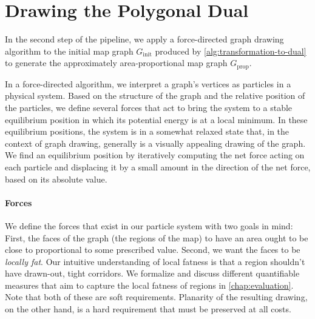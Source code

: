 \section{Drawing the Polygonal Dual}
\label{sect:drawing-the-dual}

In the second step of the pipeline, we apply a force-directed graph drawing algorithm to the initial map graph $G_\text{init}$ produced by \cref{alg:transformation-to-dual} to generate the approximately area-proportional map graph $G_\text{prop}$.

In a force-directed algorithm, we interpret a graph's vertices as particles in a physical system.
Based on the structure of the graph and the relative position of the particles, we define several forces that act to bring the system to a stable equilibrium position in which its potential energy is at a local minimum.
In these equilibrium positions, the system is in a somewhat relaxed state that, in the context of graph drawing, generally is a visually appealing drawing of the graph.
We find an equilibrium position by iteratively computing the net force acting on each particle and displacing it by a small amount in the direction of the net force, based on its absolute value.



\paragraph{Forces}

We define the forces that exist in our particle system with two goals in mind:
First, the faces of the graph (the regions of the map) to have an area ought to be close to proportional to some prescribed value.
Second, we want the faces to be \emph{locally fat}.
Our intuitive understanding of local fatness is that a region shouldn't have drawn-out, tight corridors.
We formalize and discuss different quantifiable measures that aim to capture the local fatness of regions in \cref{chap:evaluation}.
Note that both of these are soft requirements.
Planarity of the resulting drawing, on the other hand, is a hard requirement that must be preserved at all costs.

